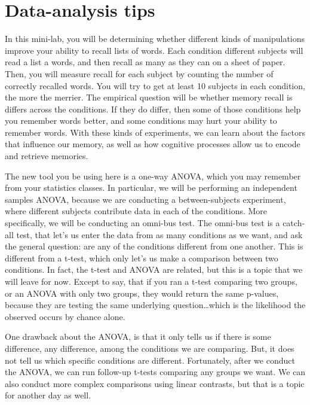 


\section{Data-analysis tips}\label{lab-4-data-analysis-tips}

In this mini-lab, you will be determining whether different kinds of
manipulations improve your ability to recall lists of words. Each
condition different subjects will read a list a words, and then recall
as many as they can on a sheet of paper. Then, you will measure recall
for each subject by counting the number of correctly recalled words. You
will try to get at least 10 subjects in each condition, the more the
merrier. The empirical question will be whether memory recall is differs
across the conditions. If they do differ, then some of those conditions
help you remember words better, and some conditions may hurt your
ability to remember words. With these kinds of experiments, we can learn
about the factors that influence our memory, as well as how cognitive
processes allow us to encode and retrieve memories.

The new tool you be using here is a one-way ANOVA, which you may
remember from your statistics classes. In particular, we will be
performing an independent samples ANOVA, because we are conducting a
between-subjects experiment, where different subjects contribute data in
each of the conditions. More specifically, we will be conducting an
omni-bus test. The omni-bus test is a catch-all test, that let's us
enter the data from as many conditions as we want, and ask the general
question: are any of the conditions different from one another. This is
different from a t-test, which only let's us make a comparison between
two conditions. In fact, the t-test and ANOVA are related, but this is a
topic that we will leave for now. Except to say, that if you ran a
t-test comparing two groups, or an ANOVA with only two groups, they
would return the same p-values, because they are testing the same
underlying question\ldots{}which is the likelihood the observed occurs
by chance alone.

One drawback about the ANOVA, is that it only tells us if there is some
difference, any difference, among the conditions we are comparing. But,
it does not tell us which specific conditions are different.
Fortunately, after we conduct the ANOVA, we can run follow-up t-tests
comparing any groups we want. We can also conduct more complex
comparisons using linear contrasts, but that is a topic for another day
as well.

